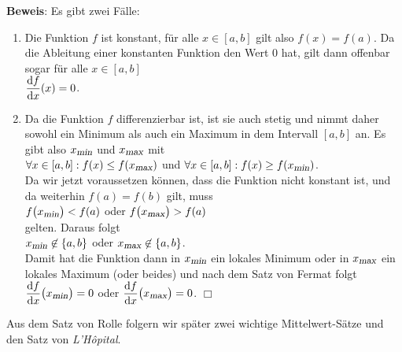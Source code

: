 \noindent
\textbf{Beweis}: Es gibt zwei
F\"alle:
\begin{enumerate}
\item Die Funktion $f$ ist konstant, f\"ur alle $x\in[a,b]$ gilt also $f(x) = f(a)$.
      Da die Ableitung einer konstanten Funktion den Wert $0$ hat, gilt dann offenbar sogar f\"ur alle $x\in[a,b]$ 
      \\[0.3cm]
      \hspace*{1.3cm} $\displaystyle\frac{\textrm{d}f}{\textrm{d}x}(x) = 0$.
\item Da die Funktion $f$ differenzierbar ist, ist sie auch stetig und nimmt
      daher sowohl ein Minimum als auch ein Maximum in dem Intervall $[a,b]$ an.  
      Es gibt also  $x_{\textsl{\footnotesize min}}$ und  $x_{\textsl{\footnotesize max}}$
      mit
      \\[0.2cm]
      \hspace*{1.3cm}
      $\forall x \in [a,b]: f(x) \leq f(x_{\textsl{\footnotesize max}})$ \quad und \quad $\forall x \in [a,b]: f(x) \geq f(x_{\textsl{\footnotesize min}})$.
      \\[0.2cm]
      Da wir jetzt voraussetzen k\"onnen, dass die Funktion nicht konstant ist, und da
      weiterhin $f(a) = f(b)$ gilt, muss 
      \\[0.2cm]
      \hspace*{1.3cm}
      $f\bigl(x_{\textsl{\footnotesize min}}\bigr) < f(a)$ \quad  oder \quad
      $f\bigl(x_{\textsl{\footnotesize max}}\bigr) > f(a)$
      \\[0.2cm]
      gelten.  Daraus folgt 
      \\[0.2cm]
      \hspace*{1.3cm}
      $x_{\textsl{\footnotesize min}}\not\in \{a,b\}$ \quad  oder \quad $x_{\textsl{\footnotesize max}}\not\in \{a,b\}$.
      \\[0.2cm]
      Damit hat die Funktion dann in $x_{\textsl{\footnotesize min}}$ ein
      lokales Minimum oder in $x_{\textsl{\footnotesize max}}$ ein lokales
      Maximum (oder beides) und nach dem Satz von Fermat folgt 
      \\[0.3cm]
      \hspace*{1.3cm}
      $\displaystyle\frac{\textrm{d}f}{\textrm{d}x}\bigl(x_{\textsl{\footnotesize min}}\bigr) = 0$ \quad  oder \quad $\displaystyle\frac{\textrm{d}f}{\textrm{d}x}\bigl(x_{\textsl{\footnotesize max}}\bigr) = 0$.
      \hspace*{\fill} $\Box$
\end{enumerate}
Aus dem Satz von Rolle folgern wir sp\"ater zwei wichtige Mittelwert-S\"atze und den Satz von 
\textsl{L'H\^opital}.

